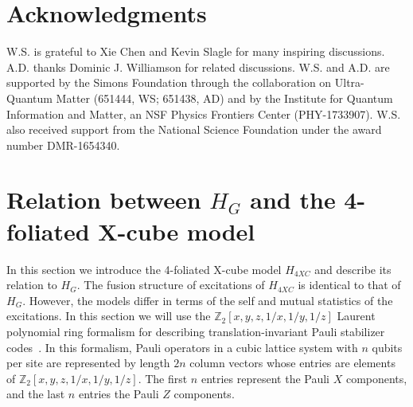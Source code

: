 \documentclass[prx,twocolumn,superscriptaddress,nofootinbib,showpacs,notitlepage]{revtex4-2}
\newcommand\thickbar[1]{\accentset{\rule{.5em}{.5pt}}{#1}}
\begin{document}
\section*{Acknowledgments}
W.S. is grateful to Xie Chen and Kevin Slagle for many inspiring discussions. A.D. thanks Dominic J. Williamson for related discussions. W.S. and A.D. are supported by the Simons Foundation through the collaboration on Ultra-Quantum Matter (651444, WS; 651438, AD) and by the Institute for Quantum Information and Matter, an NSF Physics Frontiers Center (PHY-1733907). W.S. also received support from the National Science Foundation under the award number DMR-1654340.




\appendix

\onecolumngrid




\section{Relation between $H_G$ and the 4-foliated X-cube model}
\label{app:4XC}
In this section we introduce the 4-foliated X-cube model $H_{4XC}$ and describe its relation to $H_G$. The fusion structure of excitations of $H_{4XC}$ is identical to that of $H_G$. However, the models differ in terms of the self and mutual statistics of the excitations. In this section we will use the $\mathbb{Z}_2[x,y,z,1/x,1/y,1/z]$ Laurent polynomial ring formalism for describing translation-invariant Pauli stabilizer codes~\cite{haah2013commuting}. In this formalism, Pauli operators in a cubic lattice system with $n$ qubits per site are represented by length $2n$ column vectors whose entries are elements of $\mathbb{Z}_2[x,y,z,1/x,1/y,1/z]$. The first $n$ entries represent the Pauli $X$ components, and the last $n$ entries the Pauli $Z$ components.
\end{document}
